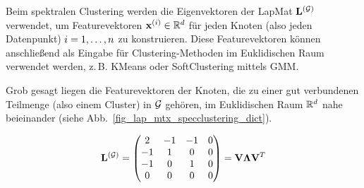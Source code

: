 {{{{{{		Beim spektralen \gls{Clustering} werden die \gls{Eigenvektoren} der \gls{LapMat} ${\bf L}^{(\mathcal{G})}$ verwendet, 
		um \gls{Featurevektoren} ${\bf x}^{(i)} \in \mathbb{R}^{d}$ für jeden Knoten (also jeden \gls{Datenpunkt}) 
		$i=1,\ldots,n$ zu konstruieren. Diese \gls{Featurevektoren} können anschließend als Eingabe für 
		\gls{Clustering}-Methoden im \gls{Euklidischen Raum} verwendet werden, z.\,B. \gls{KMeans} oder \gls{SoftClustering} mittels \gls{GMM}. 
		
		Grob gesagt liegen die \gls{Featurevektoren} der Knoten, die zu einer gut verbundenen Teilmenge 
		(also einem \gls{Cluster}) in $\mathcal{G}$ gehören, im \gls{Euklidischen Raum} $\mathbb{R}^{d}$ nahe beieinander 
		(siehe Abb.~\ref{fig_lap_mtx_specclustering_dict}).
		
		\begin{figure}[H]
			\begin{center}
				\begin{minipage}{0.4\textwidth}
				\end{minipage}
				\hspace*{5mm}
				\begin{minipage}{0.4\textwidth}
					\begin{equation} 
						{\bf L}^{(\mathcal{G})} =
						\begin{pmatrix} 
							2 & -1 & -1 & 0 \\ 
							-1 & 1 & 0 & 0 \\  
							-1 & 0 & 1 & 0 \\ 
							0 & 0 & 0 & 0 
						\end{pmatrix}
						= \mathbf{V} {\bm \Lambda} \mathbf{V}^{T}
						\nonumber
					\end{equation}
				\end{minipage}

\end{center}
\end{figure}}}}}}}
